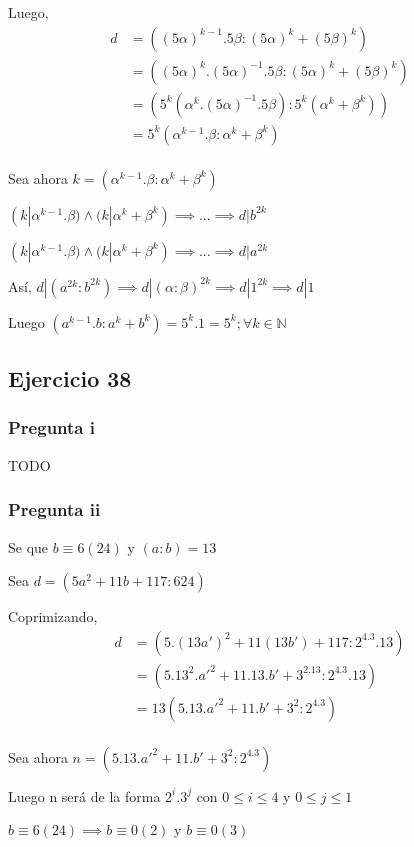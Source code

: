 Luego,
\begin{align*}
    d &= ( (5\alpha)^{k-1}.5\beta:(5\alpha)^k+(5\beta)^k ) \\  
    &= ( (5\alpha)^k. (5\alpha)^{-1}.5\beta: (5\alpha)^k+(5\beta)^k) \\
    &= ( 5^k(\alpha^k. (5\alpha)^{-1}.5\beta): 5^k(\alpha^k+\beta^k)) \\
    &= 5^k(\alpha^{k-1}.\beta: \alpha^k+\beta^k) \\
\end{align*}

Sea ahora $ k = (\alpha^{k-1}.\beta: \alpha^k+\beta^k) $

$ (k|\alpha^{k-1}.\beta) \wedge (k|\alpha^k+\beta^k) \implies ... \implies d|b^{2k}  $

$ (k|\alpha^{k-1}.\beta) \wedge (k|\alpha^k+\beta^k) \implies ... \implies d|a^{2k}  $

Así, $ d|(a^{2k}:b^{2k}) \implies d|(\alpha:\beta)^{2k} \implies d|1^{2k} \implies d|1 $

Luego $ (a^{k-1}.b:a^k+b^k) = 5^k.1 = 5^k; \forall k \in \mathbb{N} $ 

\subsection{Ejercicio 38}
\subsubsection{Pregunta i}
TODO

\subsubsection{Pregunta ii}
Se que $ b\equiv 6(24) $ y $ (a:b)=13 $

Sea $ d = (5a^2+11b+117:624) $

Coprimizando, 
\begin{align*}
    d &= (5.(13a')^2 + 11(13b')+117:2^4.3.13) \\
    &= (5.13^2.a'^2 + 11.13.b'+3^2.13:2^4.3.13) \\
    &= 13(5.13.a'^2 + 11.b'+3^2:2^4.3) \\
\end{align*}

Sea ahora $ n = (5.13.a'^2 + 11.b'+3^2:2^4.3) $

Luego n será de la forma $ 2^i.3^j $ con $ 0\leq i \leq 4 $ y $ 0\leq j\leq 1 $

$ b \equiv 6(24) \implies b \equiv 0 (2) $ y $ b \equiv 0 (3) $

